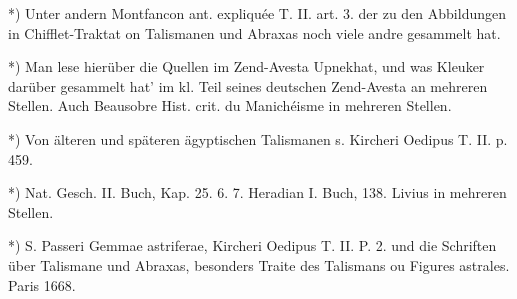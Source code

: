 \documentclass[a4paper, 11pt, oneside, polutonikogreek, german]{article}
\begin{document}
*) Unter andern Montfancon ant. expliquée T. II. art. 3. der zu den Abbildungen in Chifflet-Traktat on Talismanen und Abraxas noch viele andre gesammelt hat.

*) Man lese hierüber die Quellen im Zend-Avesta Upnekhat, und was Kleuker darüber gesammelt hat' im kl. Teil seines deutschen Zend-Avesta an mehreren Stellen. Auch Beausobre Hist. crit. du Manichéisme in mehreren Stellen.

*) Von älteren und späteren ägyptischen Talismanen s. Kircheri Oedipus T. II. p. 459.

*) Nat. Gesch. II. Buch, Kap. 25. 6. 7. Heradian I. Buch, 138. Livius in mehreren Stellen.

*) S. Passeri Gemmae astriferae, Kircheri Oedipus T. II. P. 2. und die Schriften über Talismane und Abraxas, besonders Traite des Talismans ou Figures astrales. Paris 1668.
\end{document}
